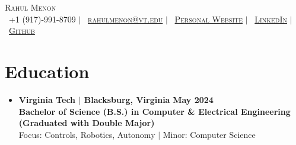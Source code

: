 \documentclass[letterpaper,11pt]{article}
\begin{document}
\pagestyle{empty} %




\begin{center}
    \Huge \scshape Rahul Menon \\
    \small
    \faPhone\ +1 (917)-991-8709 $|$ 
    \faEnvelope\ \href{mailto:rahulmenon@vt.edu}{rahulmenon@vt.edu} $|$ 
    \faGlobe\ \href{https://rmenon.netlify.app/}{Personal Website} $|$ 
    \faLinkedinSquare\ \href{https://www.linkedin.com/in/rahul-ajk-m}{LinkedIn} $|$ 
    \faGithub\ \href{https://github.com/rm1738}{Github}
\end{center}



\section{Education}
\begin{itemize}[leftmargin=0mm, label={}, itemsep=0pt]
  \item \textbf{Virginia Tech $|$ \textnormal{Blacksburg, Virginia}} \hfill {\textbf{May 2024}} \\
  \textbf{Bachelor of Science  (B.S.) in Computer \& Electrical Engineering (Graduated with Double Major)} \\
Focus: Controls, Robotics, Autonomy $|$ Minor: Computer Science
\end{itemize}




\end{document}
